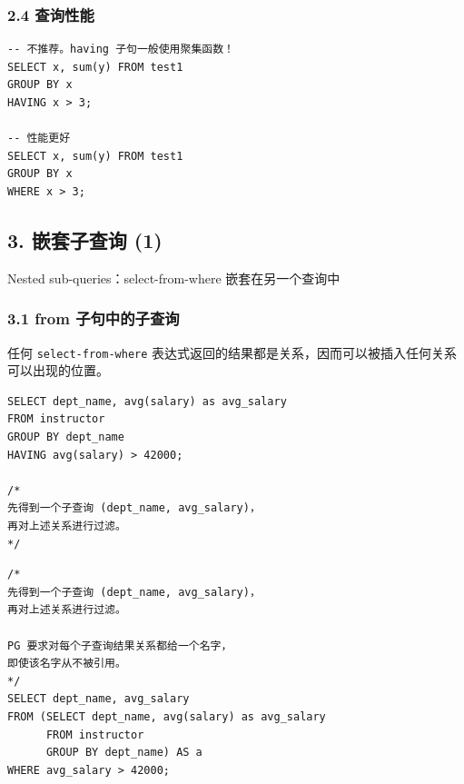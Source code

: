 \documentclass[aspectratio=169, 14pt]{beamer}
\begin{document}
\begin{frame}[fragile]
    \frametitle{2.4 查询性能}
    \begin{verbatim} 
-- 不推荐。having 子句一般使用聚集函数！
SELECT x, sum(y) FROM test1 
GROUP BY x 
HAVING x > 3;

-- 性能更好
SELECT x, sum(y) FROM test1 
GROUP BY x 
WHERE x > 3;
    \end{verbatim}

    

\end{frame}

\begin{frame}[fragile]
    \section{\textcolor{darkmidnightblue}{3. 嵌套子查询 (1)}}  
    Nested sub-queries：\alert{select-from-where} 嵌套在另一个查询中

\end{frame}

\begin{frame}[fragile]
    \frametitle{3.1 from 子句中的子查询}
    任何 \texttt{select-from-where} 表达式返回的结果都是关系，因而可以被插入任何关系可以出现的位置。

    \begin{verbatim}
SELECT dept_name, avg(salary) as avg_salary
FROM instructor
GROUP BY dept_name
HAVING avg(salary) > 42000;

/*
先得到一个子查询 (dept_name, avg_salary)，
再对上述关系进行过滤。
*/
    \end{verbatim} 
    
\end{frame}

\begin{frame}[fragile]

    \begin{verbatim}
/*
先得到一个子查询 (dept_name, avg_salary)，
再对上述关系进行过滤。

PG 要求对每个子查询结果关系都给一个名字，
即使该名字从不被引用。
*/
SELECT dept_name, avg_salary
FROM (SELECT dept_name, avg(salary) as avg_salary
      FROM instructor
      GROUP BY dept_name) AS a
WHERE avg_salary > 42000;
    \end{verbatim} 

\end{frame}
\end{document}
